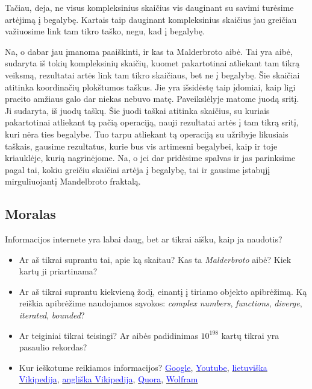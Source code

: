 \documentclass[a4paper]{article}
\newcommand{\goto}[2]{\href{\detokenize{#1}}{\textcolor{blue}{#2}}}
\begin{document}
Tačiau, deja, ne visus kompleksinius skaičius vis dauginant su savimi turėsime artėjimą į begalybę. Kartais taip dauginant kompleksinius skaičius jau greičiau važiuosime link tam tikro taško, negu, kad į begalybę. 

Na, o dabar jau įmanoma paaiškinti, ir kas ta Malderbroto aibė. Tai yra aibė, sudaryta iš tokių kompleksinių skaičių, kuomet pakartotinai atliekant tam tikrą veiksmą, rezultatai artės link tam tikro skaičiaus, bet ne į begalybę. Šie skaičiai atitinka koordinačių plokštumos taškus. Jie yra išsidėstę taip įdomiai, kaip ligi praeito amžiaus galo dar niekas nebuvo matę. Paveikslėlyje matome juodą sritį. Ji sudaryta, iš juodų taškų. Šie juodi taškai atitinka skaičius, su kuriais pakartotinai atliekant tą pačią operaciją, nauji rezultatai artės į tam tikrą sritį, kuri nėra ties begalybe. Tuo tarpu atliekant tą operaciją su užribyje likusiais taškais, gausime rezultatus, kurie bus vis artimesni begalybei, kaip ir toje kriauklėje, kurią nagrinėjome. Na, o jei dar pridėsime spalvas ir jas parinksime pagal tai, kokiu greičiu skaičiai artėja į begalybę, tai ir gausime įstabųjį mirguliuojantį Mandelbroto fraktalą.

\subsection*{Moralas}

Informacijos internete yra labai daug, bet ar tikrai aišku, kaip ja naudotis?

\begin{itemize}
\item Ar aš tikrai suprantu tai, apie ką skaitau? Kas ta \textit{Malderbroto} aibė? Kiek kartų ji priartinama?
\item Ar aš tikrai suprantu kiekvieną žodį, einantį į tiriamo objekto apibrėžimą. Ką reiškia apibrėžime naudojamos sąvokos: \textit{complex numbers}, \textit{functions}, \textit{diverge}, \textit{iterated}, \textit{bounded}?
\item Ar teiginiai tikrai teisingi? Ar aibės padidinimas $10^{198}$ kartų tikrai yra pasaulio rekordas?
\item Kur ieškotume reikiamos informacijos? \goto{https://www.google.com/}{Google}, \goto{https://www.youtube.com/watch?v=X_tYrnv_o6A}{Youtube}, \goto{https://lt.wikipedia.org/wiki/Fizikinis_dydis}{lietuviška Vikipedija}, \goto{https://en.wikipedia.org/wiki/Quantity}{angliška Vikipedija}, \goto{https://www.quora.com/What-is-the-Mandelbrot-set-1}{Quora}, \goto{https://www.wolframalpha.com/input/?i=(1\%2Bi)\%5E8}{Wolfram}
\end{itemize}
\end{document}
